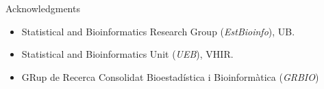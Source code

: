 \documentclass[handout]{beamer}
\begin{document}
\begin{frame}{Acknowledgments}
  \begin{itemize}
  \item Statistical and Bioinformatics Research Group (\emph{EstBioinfo}), UB.
  \item Statistical and Bioinformatics Unit (\emph{UEB}), VHIR.
  \item GRup de Recerca Consolidat Bioestad\'istica i Bioinform\`atica (\emph{GRBIO})
  \end{itemize} 
  \end{frame}
\end{document}
